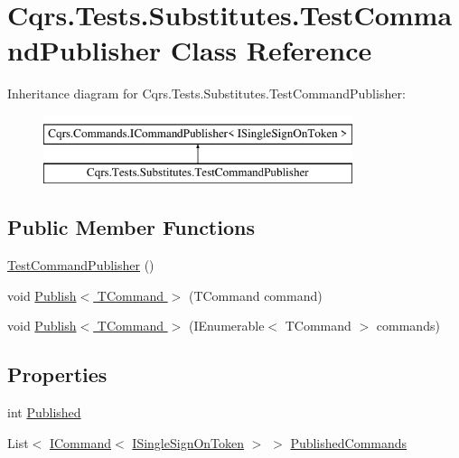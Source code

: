 \hypertarget{classCqrs_1_1Tests_1_1Substitutes_1_1TestCommandPublisher}{}\section{Cqrs.\+Tests.\+Substitutes.\+Test\+Command\+Publisher Class Reference}
\label{classCqrs_1_1Tests_1_1Substitutes_1_1TestCommandPublisher}
Inheritance diagram for Cqrs.\+Tests.\+Substitutes.\+Test\+Command\+Publisher\+:\begin{figure}[H]
\begin{center}
\leavevmode
\includegraphics[height=2.000000cm]{classCqrs_1_1Tests_1_1Substitutes_1_1TestCommandPublisher}
\end{center}
\end{figure}
\subsection*{Public Member Functions}
\begin{DoxyCompactItemize}
\item 
\hyperlink{classCqrs_1_1Tests_1_1Substitutes_1_1TestCommandPublisher_a4bb33381cc8c0e51c7e24d8369364f6c_a4bb33381cc8c0e51c7e24d8369364f6c}{Test\+Command\+Publisher} ()
\item 
void \hyperlink{classCqrs_1_1Tests_1_1Substitutes_1_1TestCommandPublisher_a4160ec853871961906b604ed9d505fee_a4160ec853871961906b604ed9d505fee}{Publish$<$ T\+Command $>$} (T\+Command command)
\item 
void \hyperlink{classCqrs_1_1Tests_1_1Substitutes_1_1TestCommandPublisher_a233f543ee8eca6fdea42b351da517fa1_a233f543ee8eca6fdea42b351da517fa1}{Publish$<$ T\+Command $>$} (I\+Enumerable$<$ T\+Command $>$ commands)
\end{DoxyCompactItemize}
\subsection*{Properties}
\begin{DoxyCompactItemize}
\item 
int \hyperlink{classCqrs_1_1Tests_1_1Substitutes_1_1TestCommandPublisher_a7ca8e3b16e648a68eb2e5f6c24dae6a7_a7ca8e3b16e648a68eb2e5f6c24dae6a7}{Published}
\item 
List$<$ \hyperlink{interfaceCqrs_1_1Commands_1_1ICommand}{I\+Command}$<$ \hyperlink{interfaceCqrs_1_1Authentication_1_1ISingleSignOnToken}{I\+Single\+Sign\+On\+Token} $>$ $>$ \hyperlink{classCqrs_1_1Tests_1_1Substitutes_1_1TestCommandPublisher_a55e6aeb09f05f73131be61b984bc5e8c_a55e6aeb09f05f73131be61b984bc5e8c}{Published\+Commands}
\end{DoxyCompactItemize}


